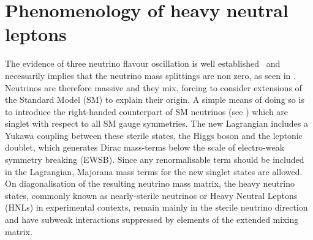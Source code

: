 \clearpage
\chapter{Phenomenology of heavy neutral leptons}
\label{cha:mass_models}

The evidence of three neutrino flavour oscillation is well established~\cite{Fukuda:1998mi,Aharmim:2005gt, Esteban:2018azc} %
and necessarily implies that the neutrino mass splittings are non zero, as seen in .
Neutrinos are therefore massive and they mix, forcing to consider extensions of the Standard Model (SM) to explain their origin. 
A simple means of doing so is to introduce the right-handed counterpart of SM neutrinos (see ) %
which are singlet with respect to all SM gauge symmetries.
The new Lagrangian includes a Yukawa coupling between these sterile states, the Higgs boson and the leptonic doublet, %
which generates Dirac mass-terms below the scale of electro-weak symmetry breaking (EWSB).
Since any renormalisable term should be included in the Lagrangian, %
Majorana mass terms for the new singlet states are allowed.
On diagonalisation of the resulting neutrino mass matrix, the heavy neutrino states, %
commonly known as nearly-sterile neutrinos or Heavy Neutral Leptons (HNLs) in experimental contexts, %
remain mainly in the sterile neutrino direction and have subweak interactions suppressed by %
elements of the extended mixing matrix. 

